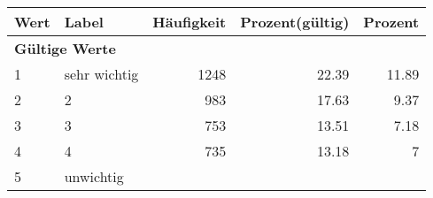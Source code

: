      \begin{longtable}{lXrrr}
     \toprule
     \textbf{Wert} & \textbf{Label} & \textbf{Häufigkeit} & \textbf{Prozent(gültig)} & \textbf{Prozent} \\
     \endhead
     \midrule
     \multicolumn{5}{l}{\textbf{Gültige Werte}}\\

     1 &
     \multicolumn{1}{X}{ sehr wichtig   } &


       \num{1248} &
       \num[round-mode=places,round-precision=2]{22,39} &
         \num[round-mode=places,round-precision=2]{11,89} \\

     2 &
     \multicolumn{1}{X}{ 2   } &


       \num{983} &
       \num[round-mode=places,round-precision=2]{17,63} &
         \num[round-mode=places,round-precision=2]{9,37} \\

     3 &
     \multicolumn{1}{X}{ 3   } &


       \num{753} &
       \num[round-mode=places,round-precision=2]{13,51} &
         \num[round-mode=places,round-precision=2]{7,18} \\

     4 &
     \multicolumn{1}{X}{ 4   } &


       \num{735} &
       \num[round-mode=places,round-precision=2]{13,18} &
         \num[round-mode=places,round-precision=2]{7} \\

     5 &
     \multicolumn{1}{X}{ unwichtig   } &



\end{longtable}
